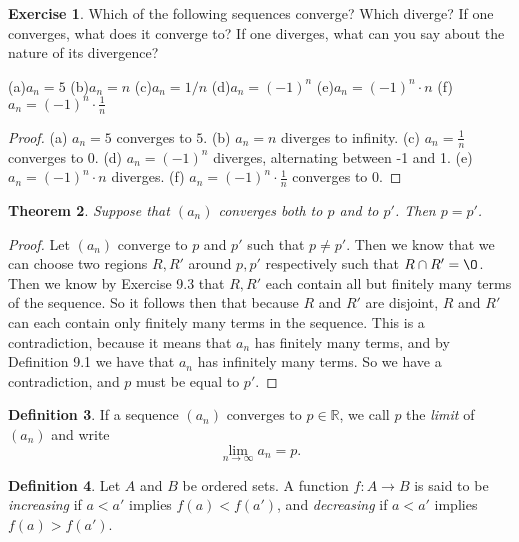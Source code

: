 \documentclass[12pt]{article}
\newcommand{\bbR}{\mathbb{R}}
\renewcommand{\emptyset}{\O}
\renewcommand{\_}[1]{\underline{ #1 }}
\newtheorem{theorem}{Theorem}[section]
\theoremstyle{definition}
\newtheorem{definition}[theorem]{Definition}
\newtheorem{exercise}[theorem]{Exercise}
\numberwithin{equation}{subsection}
\begin{document}
\begin{exercise}  Which of the following sequences converge?  Which diverge?
If one converges, what does it converge to?  If one diverges, what can you say about the 
nature of its divergence?

\centerline{
\vbox{\hbox{(a)\quad $a_n = 5$}
\hbox{(b)\quad $a_n = n$}}\hfil
\vbox{\hbox{(c)\quad  $a_n = 1/n$}
\hbox{(d)\quad  $a_n = (-1)^n$}}\hfil
\vbox{\hbox{(e)\quad  $a_n = (-1)^n\cdot n$}
\hbox{(f)\quad  $a_n = (-1)^n\cdot\frac{1}{n}$}}}
\end{exercise}

\begin{proof}
(a) $a_n = 5$ converges to $5$. \newline
(b) $a_n = n$ diverges to infinity. \newline
(c) $a_n = \frac{1}{n}$ converges to $0$. \newline
(d) $a_n = (-1)^n$ diverges, alternating between -1 and 1. \newline
(e) $a_n = (-1)^n \cdot n$ diverges. \newline
(f) $a_n = (-1)^n \cdot \frac{1}{n}$ converges to $0$.
\end{proof}

\begin{theorem}  Suppose that $(a_n)$ converges both to $p$ and to $p'$.
Then $p = p'$.
\end{theorem}

\begin{proof}
Let $(a_n)$ converge to $p$ and $p'$ such that $p \not = p'$. Then we know that we can choose two regions $R, R'$ around $p,p'$ respectively such that $R \cap R' = \emptyset$. Then we know by Exercise 9.3 that $R, R'$ each contain all but finitely many terms of the sequence. So it follows then that because $R$ and $R'$ are disjoint, $R$ and $R'$ can each contain only finitely many terms in the sequence. This is a contradiction, because it means that $a_n$ has finitely many terms, and by Definition 9.1 we have that $a_n$ has infinitely many terms. So we have a contradiction, and $p$ must be equal to $p'$. 
\end{proof}

\begin{definition}
If a sequence $(a_n)$ converges to $p\in\bbR$, we call $p$ the \emph{limit} of $(a_n)$ and write
\[
\lim_{n \rightarrow \infty} a_n = p.
\]
\end{definition}



\begin{definition}
Let $A$ and $B$ be ordered sets. A function $f:A\to B$ is said to be \emph{increasing} if $a<a'$ implies $f(a)<f(a')$, and \emph{decreasing} if $a<a'$ implies $f(a)>f(a')$.
\end{definition}
\end{document}
